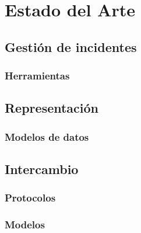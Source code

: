 \chapter{Estado del Arte}
\label{capitulo2}

%

\section{Gestión de incidentes}
\label{gestiondeincidentes}
\subsection{Herramientas}
\label{herramientas}


\section{Representación}
\label{representacion}
\subsection{Modelos de datos}
\label{modelodedatos}



%


\section{Intercambio}
\label{intercambio}
\subsection{Protocolos}
\label{protocolos}
 
 
\subsection{Modelos}
\label{modelos}
 
